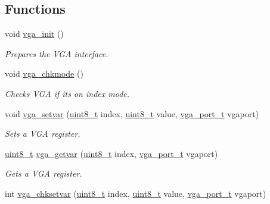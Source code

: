 \subsection*{Functions}
\begin{DoxyCompactItemize}
\item 
void \hyperlink{a00008_a0efe6c57778fcfbff5f79a9aa83df38a_a0efe6c57778fcfbff5f79a9aa83df38a}{vga\+\_\+init} ()
\begin{DoxyCompactList}\small\item\em Prepares the V\+GA interface. \end{DoxyCompactList}\item 
void \hyperlink{a00008_aa156f6e955d649347fb0cf26bef28c1d_aa156f6e955d649347fb0cf26bef28c1d}{vga\+\_\+chkmode} ()
\begin{DoxyCompactList}\small\item\em Checks V\+GA if its on index mode. \end{DoxyCompactList}\item 
void \hyperlink{a00008_ae3f16d4cffd57acbdfa6c399a72ae721_ae3f16d4cffd57acbdfa6c399a72ae721}{vga\+\_\+setvar} (\hyperlink{a00038_aba7bc1797add20fe3efdf37ced1182c5_aba7bc1797add20fe3efdf37ced1182c5}{uint8\+\_\+t} index, \hyperlink{a00038_aba7bc1797add20fe3efdf37ced1182c5_aba7bc1797add20fe3efdf37ced1182c5}{uint8\+\_\+t} value, \hyperlink{a00008_a63bf0a876af36076ffb713ff00618ce4_a63bf0a876af36076ffb713ff00618ce4}{vga\+\_\+port\+\_\+t} vgaport)
\begin{DoxyCompactList}\small\item\em Sets a V\+GA register. \end{DoxyCompactList}\item 
\hyperlink{a00038_aba7bc1797add20fe3efdf37ced1182c5_aba7bc1797add20fe3efdf37ced1182c5}{uint8\+\_\+t} \hyperlink{a00008_a42ac16bdd0eeb4298fca66ca858da2c4_a42ac16bdd0eeb4298fca66ca858da2c4}{vga\+\_\+getvar} (\hyperlink{a00038_aba7bc1797add20fe3efdf37ced1182c5_aba7bc1797add20fe3efdf37ced1182c5}{uint8\+\_\+t} index, \hyperlink{a00008_a63bf0a876af36076ffb713ff00618ce4_a63bf0a876af36076ffb713ff00618ce4}{vga\+\_\+port\+\_\+t} vgaport)
\begin{DoxyCompactList}\small\item\em Gets a V\+GA register. \end{DoxyCompactList}\item 
int \hyperlink{a00008_a2e6e7034bcddc0b07e062ed478c90a8f_a2e6e7034bcddc0b07e062ed478c90a8f}{vga\+\_\+chksetvar} (\hyperlink{a00038_aba7bc1797add20fe3efdf37ced1182c5_aba7bc1797add20fe3efdf37ced1182c5}{uint8\+\_\+t} index, \hyperlink{a00038_aba7bc1797add20fe3efdf37ced1182c5_aba7bc1797add20fe3efdf37ced1182c5}{uint8\+\_\+t} value, \hyperlink{a00008_a63bf0a876af36076ffb713ff00618ce4_a63bf0a876af36076ffb713ff00618ce4}{vga\+\_\+port\+\_\+t} vgaport)

\end{DoxyCompactItemize}
